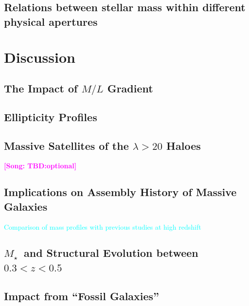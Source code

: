 \documentclass[preprint]{aastex}
\def\mstar{{$M_{\star}$}~}
\newcommand{\plan}[1]{\textcolor{cyan}{#1}}
\newcommand{\song}[1]{\textcolor{magenta}{\textbf{[Song: #1]}}}
\begin{document}
\begin{CJK*}{UTF8}{gbsn}
\subsection{Relations between stellar mass within different physical apertures}


\section{Discussion}

\subsection{The Impact of $M/L$ Gradient}

\subsection{Ellipticity Profiles}

\subsection{Massive Satellites of the $\lambda > 20$ Haloes}
\song{TBD:optional}

\subsection{Implications on Assembly History of Massive Galaxies}

    \plan{Comparison of mass profiles with previous studies at high redshift}

\subsection{\mstar and Structural Evolution between $0.3 < z < 0.5$}

    
\subsection{Impact from ``Fossil Galaxies''}


\end{CJK*}
\end{document}
